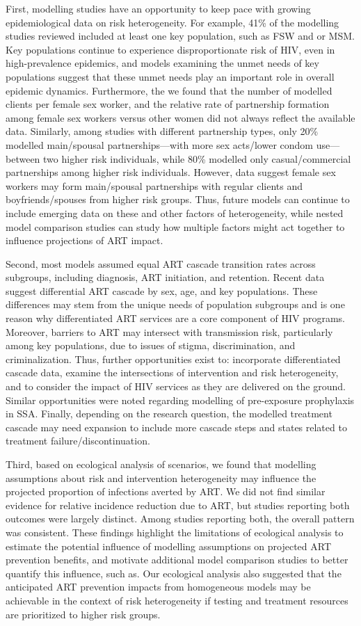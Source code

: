 First, modelling studies have an opportunity to keep pace with growing epidemiological data on risk heterogeneity.
For example, 41\% of the modelling studies reviewed included at least one key population, such as FSW and or MSM.
Key populations continue to experience disproportionate risk of HIV, even in high-prevalence epidemics,
and models examining the unmet needs of key populations suggest that
these unmet needs play an important role in overall epidemic dynamics.
Furthermore, the we found that the number of modelled clients per female sex worker, and
the relative rate of partnership formation among female sex workers versus other women
did not always reflect the available data.
Similarly, among studies with different partnership types, only 20\% modelled
main/spousal partnerships---with more sex acts/lower condom use---between two higher risk individuals,
while 80\% modelled only casual/commercial partnerships among higher risk individuals.
However, data suggest female sex workers may form main/spousal partnerships
with regular clients and boyfriends/spouses from higher risk groups.
Thus, future models can continue to include emerging data on these and other factors of heterogeneity,
while nested model comparison studies can study how
multiple factors might act together to influence projections of ART impact.

Second, most models assumed equal ART cascade transition rates across subgroups,
including diagnosis, ART initiation, and retention.
Recent data suggest differential ART cascade by sex, age, and key populations.
These differences may stem from the unique needs of population subgroups
and is one reason why differentiated ART services are a core component of HIV programs.
Moreover, barriers to ART may intersect with transmission risk, particularly among key populations,
due to issues of stigma, discrimination, and criminalization.
Thus, further opportunities exist to: incorporate differentiated cascade data,
examine the intersections of intervention and risk heterogeneity, and
to consider the impact of HIV services as they are delivered on the ground.
Similar opportunities were noted regarding modelling of pre-exposure prophylaxis in SSA.
Finally, depending on the research question, the modelled treatment cascade may need expansion
to include more cascade steps and states related to treatment failure/discontinuation.

Third, based on ecological analysis of scenarios, we found that
modelling assumptions about risk and intervention heterogeneity
may influence the projected proportion of infections averted by ART.
We did not find similar evidence for relative incidence reduction due to ART,
but studies reporting both outcomes were largely distinct.
Among studies reporting both, the overall pattern was consistent.
These findings highlight the limitations of ecological analysis to estimate
the potential influence of modelling assumptions on projected ART prevention benefits,
and motivate additional model comparison studies to better quantify this influence,
such as.
Our ecological analysis also suggested that the anticipated ART prevention impacts from homogeneous models
may be achievable in the context of risk heterogeneity
if testing and treatment resources are prioritized to higher risk groups.

